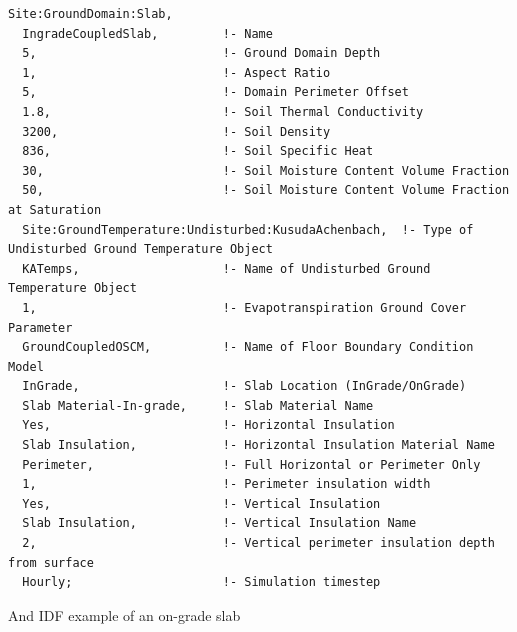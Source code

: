 \begin{lstlisting}
Site:GroundDomain:Slab,
  IngradeCoupledSlab,         !- Name
  5,                          !- Ground Domain Depth
  1,                          !- Aspect Ratio
  5,                          !- Domain Perimeter Offset
  1.8,                        !- Soil Thermal Conductivity
  3200,                       !- Soil Density
  836,                        !- Soil Specific Heat
  30,                         !- Soil Moisture Content Volume Fraction
  50,                         !- Soil Moisture Content Volume Fraction at Saturation
  Site:GroundTemperature:Undisturbed:KusudaAchenbach,  !- Type of Undisturbed Ground Temperature Object
  KATemps,                    !- Name of Undisturbed Ground Temperature Object
  1,                          !- Evapotranspiration Ground Cover Parameter
  GroundCoupledOSCM,          !- Name of Floor Boundary Condition Model
  InGrade,                    !- Slab Location (InGrade/OnGrade)
  Slab Material-In-grade,     !- Slab Material Name
  Yes,                        !- Horizontal Insulation
  Slab Insulation,            !- Horizontal Insulation Material Name
  Perimeter,                  !- Full Horizontal or Perimeter Only
  1,                          !- Perimeter insulation width
  Yes,                        !- Vertical Insulation
  Slab Insulation,            !- Vertical Insulation Name
  2,                          !- Vertical perimeter insulation depth from surface
  Hourly;                     !- Simulation timestep
\end{lstlisting}

And IDF example of an on-grade slab

